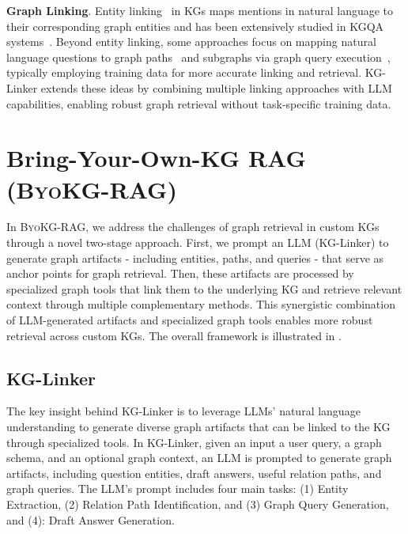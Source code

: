 \documentclass[11pt]{article}
\newcommand{\byokg}{\textsc{ByoKG-RAG}\xspace}
\newcommand{\glink}{KG-Linker\xspace}
\begin{document}
\textbf{Graph Linking}. 
Entity linking~\citep{yadav2019survey} in KGs maps mentions in natural language to their corresponding graph entities and has been extensively studied in KGQA systems~\citep{yih2015semantic,oliya2021end,li2020efficient}. 
Beyond entity linking, some approaches focus on mapping natural language questions to graph paths~\citep{saxena2020improving,shi2021transfernet} and subgraphs via graph query execution~\citep{lan2020query,gu2022arcaneqa,shu2022tiara,yu2022decaf,gao2025promoting}, typically employing training data for more accurate linking and retrieval.
\glink extends these ideas by combining multiple linking approaches with LLM capabilities, enabling robust graph retrieval without task-specific training data.



\section{Bring-Your-Own-KG RAG (\byokg)}
\label{sec:kglink}

In \byokg, we address the challenges of graph retrieval in custom KGs through a novel two-stage approach. First, we prompt an LLM (\glink) to generate graph artifacts - including entities, paths, and queries - that serve as anchor points for graph retrieval. Then, these artifacts are processed by specialized graph tools that link them to the underlying KG and retrieve relevant context through multiple complementary methods. This synergistic combination of LLM-generated artifacts and specialized graph tools enables more robust retrieval across custom KGs. 
The overall framework is  illustrated in .

\subsection{\glink}
The key insight behind \glink is to leverage LLMs' natural language understanding to generate diverse graph artifacts that can be linked to the KG through specialized tools.
In \glink, given an input a user query, a graph schema, and an optional graph context, an LLM is  prompted  to generate graph artifacts, including question entities, draft answers, useful relation paths, and graph queries. The LLM's prompt includes four main tasks: (1) Entity Extraction,  (2) Relation Path Identification, and (3) Graph Query Generation, and (4): Draft Answer Generation.  
\end{document}
